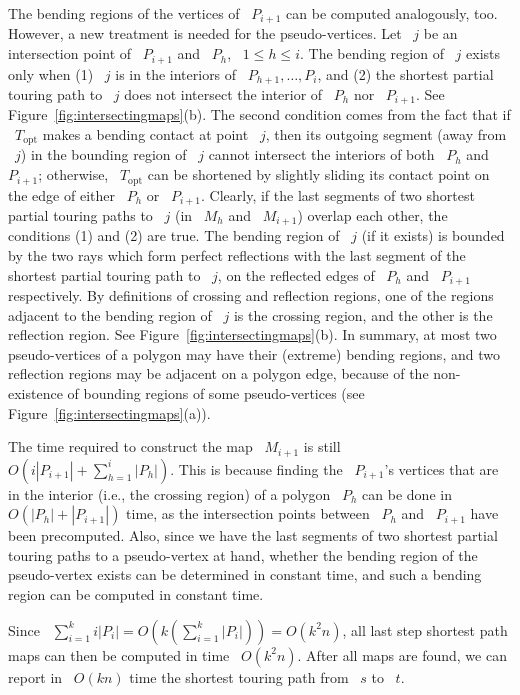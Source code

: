 \documentclass[11pt]{article}
\begin{document}
The bending regions of the vertices of ~\(P_{i+1}\) can be computed analogously, too.
However, a new treatment is needed for the pseudo-vertices.
Let ~\(j\) be an intersection point of ~\(P_{i+1}\) and ~\(P_h\), ~\(1 \le h \le i\).
The bending region of ~\(j\) exists only when (1) ~\(j\) is in the interiors of ~\(P_{h+1}, \ldots, P_i\), and (2) the shortest partial touring path to ~\(j\) does not intersect the interior of ~\(P_h\) nor ~\(P_{i+1}\).
See Figure~\ref{fig:intersectingmaps}(b).
The second condition comes from the fact that if ~\(T_{\mathrm{opt}}\) makes a bending contact at point ~\(j\), then its outgoing segment (away from ~\(j\)) in the bounding region of ~\(j\) cannot intersect the interiors of both ~\(P_h\) and ~\(P_{i+1}\); otherwise, ~\(T_{\mathrm{opt}}\) can be shortened by slightly sliding its contact point on the edge of either ~\(P_h\) or ~\(P_{i+1}\).
Clearly, if the last segments of two shortest partial touring paths to ~\(j\) (in ~\(M_h\) and ~\(M_{i+1}\)) overlap each other, the conditions (1) and (2) are true.
The bending region of ~\(j\) (if it exists) is bounded by the two rays which form perfect reflections with the last segment of the shortest partial touring path to ~\(j\), on the reflected edges of ~\(P_h\) and ~\(P_{i+1}\) respectively.
By definitions of crossing and reflection regions, one of the regions adjacent to the bending region of ~\(j\) is the crossing region, and the other is the reflection region.
See Figure~\ref{fig:intersectingmaps}(b).
In summary, at most two pseudo-vertices of a polygon may have their (extreme) bending regions, and two reflection regions may be adjacent on a polygon edge, because of the non-existence of bounding regions of some pseudo-vertices (see Figure~\ref{fig:intersectingmaps}(a)).

The time required to construct the map ~\(M_{i+1}\) is still ~\(O\!\left(i|P_{i+1}| + \sum_{h=1}^i |P_h|\right)\).
This is because finding the ~\(P_{i+1}\)'s vertices that are in the interior (i.e., the crossing region) of a polygon ~\(P_h\) can be done in ~\(O(|P_h| + |P_{i+1}|)\) time, as the intersection points between ~\(P_h\) and ~\(P_{i+1}\) have been precomputed.
Also, since we have the last segments of two shortest partial touring paths to a pseudo-vertex at hand, whether the bending region of the pseudo-vertex exists can be determined in constant time, and such a bending region can be computed in constant time.

Since ~\(\sum_{i=1}^k i|P_i| = O\!\left(k\left(\sum_{i=1}^k |P_i|\right)\right) = O(k^2n)\), all last step shortest path maps can then be computed in time ~\(O(k^2n)\).
After all maps are found, we can report in ~\(O(kn)\) time the shortest touring path from ~\(s\) to ~\(t\).
\end{document}
